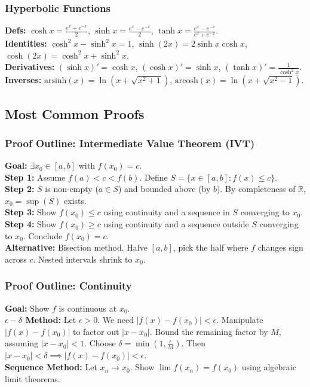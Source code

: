 \subsubsection{Hyperbolic Functions}
\textbf{Defs:} $\cosh x = \frac{e^x + e^{-x}}{2}$, $\sinh x = \frac{e^x - e^{-x}}{2}$, $\tanh x = \frac{e^x - e^{-x}}{e^x + e^{-x}}$. \\
\textbf{Identities:} $\cosh^2 x - \sinh^2 x = 1$, $\sinh(2x) = 2 \sinh x \cosh x$, $\cosh(2x) = \cosh^2 x + \sinh^2 x$. \\
\textbf{Derivatives:} $(\sinh x)' = \cosh x$, $(\cosh x)' = \sinh x$, $(\tanh x)' = \frac{1}{\cosh^2 x}$. \\
\textbf{Inverses:} $\text{arsinh}(x) = \ln(x + \sqrt{x^2+1})$, $\text{arcosh}(x) = \ln(x + \sqrt{x^2-1})$.

\subsection{Most Common Proofs}

\subsubsection{Proof Outline: Intermediate Value Theorem (IVT)}
\textbf{Goal:} $\exists x_0 \in [a,b]$ with $f(x_0) = c$. \\
\textbf{Step 1:} Assume $f(a) < c < f(b)$. Define $S = \{x \in [a,b] : f(x) \le c\}$. \\
\textbf{Step 2:} $S$ is non-empty ($a \in S$) and bounded above (by $b$). By completeness of $\mathbb{R}$, $x_0 = \sup(S)$ exists. \\
\textbf{Step 3:} Show $f(x_0) \le c$ using continuity and a sequence in $S$ converging to $x_0$. \\
\textbf{Step 4:} Show $f(x_0) \ge c$ using continuity and a sequence outside $S$ converging to $x_0$. Conclude $f(x_0) = c$. \\
\textbf{Alternative:} Bisection method. Halve $[a,b]$, pick the half where $f$ changes sign across $c$. Nested intervals shrink to $x_0$.

\subsubsection{Proof Outline: Continuity}
\textbf{Goal:} Show $f$ is continuous at $x_0$. \\
\textbf{$\epsilon-\delta$ Method:} Let $\epsilon > 0$. We need $|f(x) - f(x_0)| < \epsilon$. Manipulate $|f(x) - f(x_0)|$ to factor out $|x - x_0|$. Bound the remaining factor by $M$, assuming $|x - x_0| < 1$. Choose $\delta = \min(1, \frac{\epsilon}{M})$. Then $|x - x_0| < \delta \implies |f(x) - f(x_0)| < \epsilon$. \\
\textbf{Sequence Method:} Let $x_n \to x_0$. Show $\lim f(x_n) = f(x_0)$ using algebraic limit theorems.

